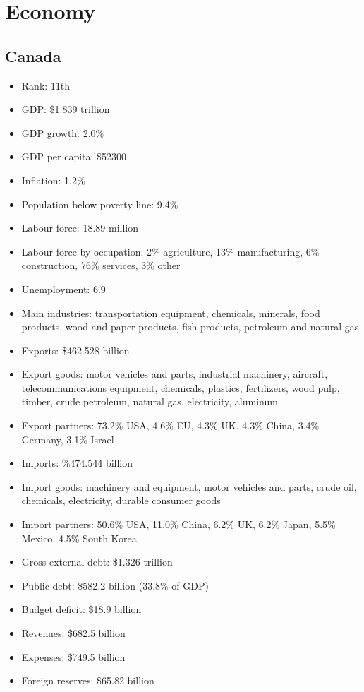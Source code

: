 \documentclass{article}
\begin{document}
\section{Economy}
\subsection{Canada}
\begin{itemize}
	\item Rank: 11th
	\item GDP: \$1.839 trillion
	\item GDP growth: 2.0\%
	\item GDP per capita: \$52300
	\item Inflation: 1.2\%
	\item Population below poverty line: 9.4\%
	\item Labour force: 18.89 million
	\item Labour force by occupation: 2\% agriculture, 13\% manufacturing, 6\% construction, 76\% services, 3\% other
	\item Unemployment: 6.9%
	\item Main industries: transportation equipment, chemicals, minerals, food products, wood and paper products, fish products, petroleum and natural gas
	\item Exports: \$462.528 billion
	\item Export goods: motor vehicles and parts, industrial machinery, aircraft, telecommunications equipment, chemicals, plastics, fertilizers, wood pulp, timber, crude petroleum, natural gas, electricity, aluminum
	\item Export partners: 73.2\% USA, 4.6\% EU, 4.3\% UK, 4.3\% China, 3.4\% Germany, 3.1\% Israel
	\item Imports: \%474.544 billion
	\item Import goods: machinery and equipment, motor vehicles and parts, crude oil, chemicals, electricity, durable consumer goods
	\item Import partners: 50.6\% USA, 11.0\% China, 6.2\% UK, 6.2\% Japan, 5.5\% Mexico, 4.5\% South Korea
	\item Gross external debt: \$1.326 trillion
	\item Public debt: \$582.2 billion (33.8\% of GDP)
	\item Budget deficit: \$18.9 billion
	\item Revenues: \$682.5 billion
	\item Expenses: \$749.5 billion
	\item Foreign reserves: \$65.82 billion
\end{itemize}
\end{document}
